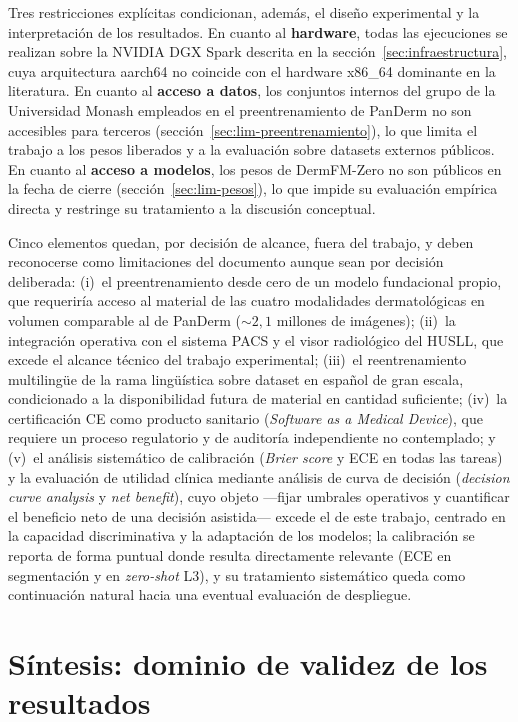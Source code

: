 Tres restricciones explícitas condicionan, además, el diseño
experimental y la interpretación de los resultados. En cuanto al
\textbf{hardware}, todas las ejecuciones se realizan sobre la NVIDIA
DGX Spark descrita en la sección~\ref{sec:infraestructura}, cuya
arquitectura aarch64 no coincide con el hardware x86\_64 dominante en
la literatura. En cuanto al \textbf{acceso a datos}, los conjuntos
internos del grupo de la Universidad Monash empleados en el
preentrenamiento de PanDerm no son accesibles para terceros
(sección~\ref{sec:lim-preentrenamiento}), lo que limita el trabajo a
los pesos liberados y a la evaluación sobre datasets externos
públicos. En cuanto al \textbf{acceso a modelos}, los pesos de
DermFM-Zero no son públicos en la fecha de cierre
(sección~\ref{sec:lim-pesos}), lo que impide su evaluación empírica
directa y restringe su tratamiento a la discusión conceptual.

Cinco elementos quedan, por decisión de alcance, fuera del trabajo,
y deben reconocerse como limitaciones del
documento aunque sean por decisión deliberada: (i)~el
preentrenamiento desde cero de un modelo fundacional propio, que
requeriría acceso al material de las cuatro modalidades
dermatológicas en volumen comparable al de PanDerm
($\sim 2{,}1$ millones de imágenes); (ii)~la integración
operativa con el sistema PACS y el visor radiológico del HUSLL,
que excede el alcance técnico del trabajo experimental;
(iii)~el reentrenamiento multilingüe de la rama lingüística sobre
dataset en español de gran escala, condicionado a la disponibilidad
futura de material en cantidad suficiente; (iv)~la certificación
CE como producto sanitario (\emph{Software as a Medical Device}),
que requiere un proceso regulatorio y de auditoría independiente
no contemplado; y (v)~el análisis sistemático de calibración
(\emph{Brier score} y ECE en todas las tareas) y la evaluación de
utilidad clínica mediante análisis de curva de decisión
(\emph{decision curve analysis} y \emph{net benefit}), cuyo objeto
---fijar umbrales operativos y cuantificar el beneficio neto de una
decisión asistida--- excede el de este trabajo, centrado en la
capacidad discriminativa y la adaptación de los modelos; la
calibración se reporta de forma puntual donde resulta directamente
relevante (ECE en segmentación y en \emph{zero-shot} L3), y su
tratamiento sistemático queda como continuación natural hacia una
eventual evaluación de despliegue.

\section{Síntesis: dominio de validez de los resultados}
\label{sec:lim-sintesis}

